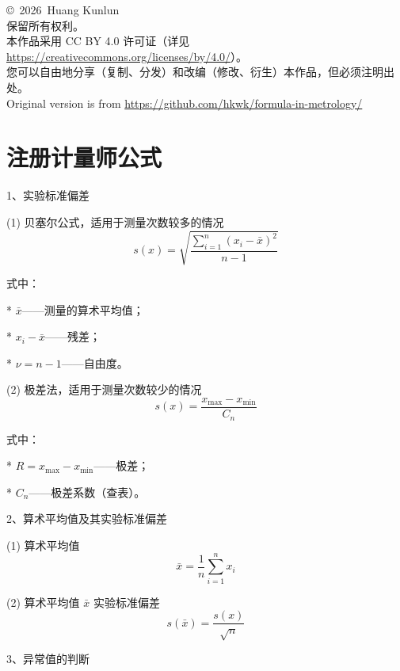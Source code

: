 \documentclass[UTF8]{ctexart}
\newcommand{\copyrightYear}{2026}
\newcommand{\copyrightOwner}{Huang Kunlun}
\newcommand{\licenseText}{本作品采用 CC BY 4.0 许可证（详见 \url{https://creativecommons.org/licenses/by/4.0/}）。}
\newcommand{\githuburl}{\url{https://github.com/hkwk/formula-in-metrology/}}
\begin{document}
\thispagestyle{empty}
\begin{center}
    \vspace*{\fill}
    {\Huge \copyright\ \copyrightYear\ \copyrightOwner} \\[1cm]
    {\Large 保留所有权利。} \\[0.5cm]
    \licenseText \\[0.5cm]
    {\large 您可以自由地分享（复制、分发）和改编（修改、衍生）本作品，但必须注明出处。} \\[0.5cm]
    {\large Original version is from \githuburl} \\
    \vspace*{\fill}
\end{center}
\newpage

\pagestyle{fancy}   %

\section{注册计量师公式}


1、实验标准偏差

(1) 贝塞尔公式，适用于测量次数较多的情况
\[
s(x) = \sqrt{\frac{\sum_{i=1}^{n} (x_i - \bar{x})^2}{n-1}}
\]

式中：

*   \(\bar{x}\)——测量的算术平均值；

*   \(x_i - \bar{x}\)——残差；

*   \(\nu = n-1\)——自由度。

(2) 极差法，适用于测量次数较少的情况
\[
s(x) = \frac{x_{\max} - x_{\min}}{C_n}
\]

式中：

*   \(R = x_{\max} - x_{\min}\)——极差；

*   \(C_n\)——极差系数（查表）。

\vspace{5mm} 
2、算术平均值及其实验标准偏差

(1) 算术平均值
\[
\bar{x} = \frac{1}{n} \sum_{i=1}^{n} x_i
\]

(2) 算术平均值 \(\bar{x}\) 实验标准偏差
\[
s(\bar{x}) = \frac{s(x)}{\sqrt{n}}
\]

\vspace{5mm} 
3、异常值的判断
\end{document}
